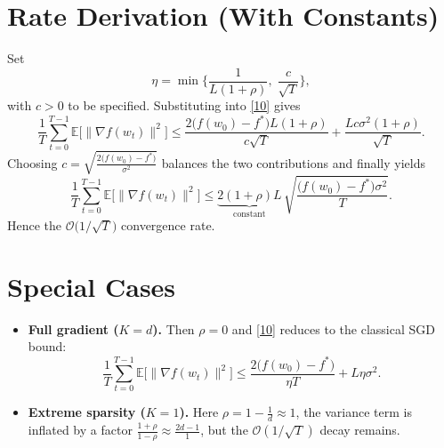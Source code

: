 \documentclass{article}
\begin{document}
\section*{Rate Derivation (With Constants)}
Set
\[
\eta = \min\Big\{\frac{1}{L(1+\rho)},\;\frac{c}{\sqrt{T}}\Big\},
\]
with $c>0$ to be specified.  Substituting into \eqref{10} gives
\[
\frac{1}{T}\sum_{t=0}^{T-1}\mathbb{E}\big[\|\nabla f(w_t)\|^{2}\big]
\le
\frac{2\big(f(w_0)-f^{*}\big)L(1+\rho)}{c\sqrt{T}}
   +\frac{L c\sigma^{2}(1+\rho)}{\sqrt{T}}.
\]
Choosing $c = \sqrt{\frac{2\big(f(w_0)-f^{*}\big)}{\sigma^{2}}}$ balances the two contributions and finally yields
\[
\frac{1}{T}\sum_{t=0}^{T-1}\mathbb{E}\big[\|\nabla f(w_t)\|^{2}\big]
\le
\underbrace{2(1+\rho)L}_{\text{constant}}\,
\sqrt{\frac{\big(f(w_0)-f^{*}\big)\sigma^{2}}{T}}.
\]
Hence the $\mathcal{O}\!\big(1/\sqrt{T}\big)$ convergence rate.

\section*{Special Cases}
\begin{itemize}
\item \textbf{Full gradient ($K=d$).} Then $\rho=0$ and \eqref{10} reduces to the classical SGD bound:
\[
\frac{1}{T}\sum_{t=0}^{T-1}\mathbb{E}\big[\|\nabla f(w_t)\|^{2}\big]
\le
\frac{2\big(f(w_0)-f^{*}\big)}{\eta T}+L\eta\sigma^{2}.
\]
\item \textbf{Extreme sparsity ($K=1$).} Here $\rho=1-\frac{1}{d}\approx 1$, the variance term is inflated by a factor $\frac{1+\rho}{1-\rho}\approx\frac{2d-1}{1}$, but the $\mathcal{O}(1/\sqrt{T})$ decay remains.
\end{itemize}
\end{document}
